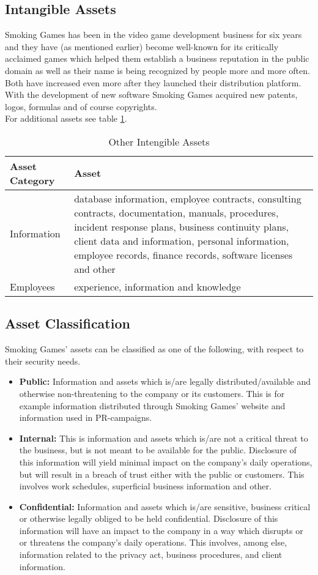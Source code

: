 \subsection{Intangible Assets}
Smoking Games has been in the video game development business for six years and they have (as mentioned earlier) become well-known for its critically acclaimed games which helped them establish a business reputation in the public domain as well as their name is being recognized by people more and more often. Both have increased even more after they launched their distribution platform.\\
With the development of new software Smoking Games acquired new patents, logos, formulas and of course copyrights.\\
For additional assets see table \ref{tab:OtherTangibleAssets}. 
\begin{table}[h]
	\centering
	\begin{tabular}{l | l}
		\textbf{Asset Category} & \textbf{Asset}\\\hline\hline
		Information & \parbox[t]{7cm}{database information, employee contracts, consulting contracts, documentation,
manuals, procedures, incident response plans, business continuity plans, client data and
information, personal information, employee records, finance records, software licenses
and other}\\\hline
		Employees & \parbox[t]{7cm}{experience, information and knowledge}
	\end{tabular}
	\caption{Other Intengible Assets}\label{tab:OtherTangibleAssets}
\end{table}
\subsection{Asset Classification}
Smoking Games' assets can be classified as one of the following, with respect to their security needs.\\
\medskip
\begin{itemize}
	\item \textbf{Public:} Information and assets which is/are legally distributed/available and otherwise non-threatening to the company or its customers. This is for example information distributed through Smoking Games' website and information used in PR-campaigns.
	\item \textbf{Internal:} This is information and assets which is/are not a critical threat to the business, but is not meant to be available for the public. Disclosure of this information will yield minimal impact on the company’s daily operations, but will result in a breach of trust either with the public or customers. This involves work schedules, superficial business information and other.
	\item \textbf{Confidential:} Information and assets which is/are sensitive, business critical or otherwise legally obliged to be held confidential. Disclosure of this information will have an impact to the company in a way which disrupts or or threatens the company’s daily operations. This involves, among else, information related to the privacy act, business procedures, and client information.
\end{itemize}
\newpage